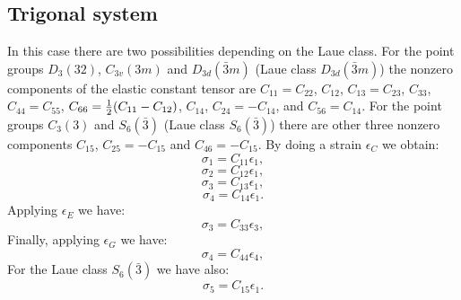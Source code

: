 \documentclass[12pt,a4paper]{article}
\begin{document}
\subsection{\color{web-blue}Trigonal system}
In this case there are two possibilities depending on the Laue class. For
the point groups $D_3(32)$, $C_{3v}(3m)$ and $D_{3d}(\bar 3m)$ (Laue class
$D_{3d}(\bar 3m)$) the nonzero components of the elastic constant tensor
are $C_{11}=C_{22}$, $C_{12}$, $C_{13}=C_{23}$, $C_{33}$, $C_{44}=C_{55}$, 
$C_{66}={1\over 2} (C_{11}-C_{12})$, $C_{14}$, $C_{24}=-C_{14}$, and 
$C_{56}=C_{14}$. For the point groups $C_3(3)$ and $S_6(\bar 3)$ (Laue
class $S_6(\bar 3)$) there are other three nonzero components $C_{15}$, 
$C_{25}=-C_{15}$ and $C_{46}=-C_{15}$. 
By doing a strain $\epsilon_C$ we obtain:
\begin{equation}
\sigma_1=C_{11} \epsilon_1,
\end{equation}
\begin{equation}
\sigma_2=C_{12} \epsilon_1,
\end{equation}
\begin{equation}
\sigma_3=C_{13} \epsilon_1,
\end{equation}
\begin{equation}
\sigma_4=C_{14} \epsilon_1.
\end{equation}
Applying $\epsilon_E$ we have:
\begin{equation}
\sigma_3=C_{33} \epsilon_3,
\end{equation}
Finally, applying $\epsilon_G$ we have:
\begin{equation}
\sigma_4=C_{44} \epsilon_4,
\end{equation}
For the Laue class $S_6(\bar 3)$ we have also:
\begin{equation}
\sigma_5=C_{15} \epsilon_1.
\end{equation}
\end{document}
